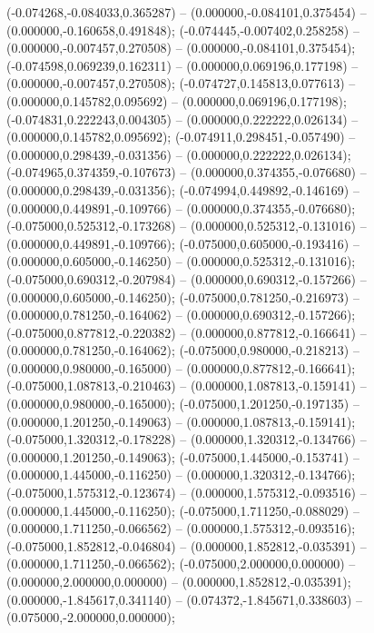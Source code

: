  (-0.074268,-0.084033,0.365287) -- (0.000000,-0.084101,0.375454) -- (0.000000,-0.160658,0.491848);
 (-0.074445,-0.007402,0.258258) -- (0.000000,-0.007457,0.270508) -- (0.000000,-0.084101,0.375454);
 (-0.074598,0.069239,0.162311) -- (0.000000,0.069196,0.177198) -- (0.000000,-0.007457,0.270508);
 (-0.074727,0.145813,0.077613) -- (0.000000,0.145782,0.095692) -- (0.000000,0.069196,0.177198);
 (-0.074831,0.222243,0.004305) -- (0.000000,0.222222,0.026134) -- (0.000000,0.145782,0.095692);
 (-0.074911,0.298451,-0.057490) -- (0.000000,0.298439,-0.031356) -- (0.000000,0.222222,0.026134);
 (-0.074965,0.374359,-0.107673) -- (0.000000,0.374355,-0.076680) -- (0.000000,0.298439,-0.031356);
 (-0.074994,0.449892,-0.146169) -- (0.000000,0.449891,-0.109766) -- (0.000000,0.374355,-0.076680);
 (-0.075000,0.525312,-0.173268) -- (0.000000,0.525312,-0.131016) -- (0.000000,0.449891,-0.109766);
 (-0.075000,0.605000,-0.193416) -- (0.000000,0.605000,-0.146250) -- (0.000000,0.525312,-0.131016);
 (-0.075000,0.690312,-0.207984) -- (0.000000,0.690312,-0.157266) -- (0.000000,0.605000,-0.146250);
 (-0.075000,0.781250,-0.216973) -- (0.000000,0.781250,-0.164062) -- (0.000000,0.690312,-0.157266);
 (-0.075000,0.877812,-0.220382) -- (0.000000,0.877812,-0.166641) -- (0.000000,0.781250,-0.164062);
 (-0.075000,0.980000,-0.218213) -- (0.000000,0.980000,-0.165000) -- (0.000000,0.877812,-0.166641);
 (-0.075000,1.087813,-0.210463) -- (0.000000,1.087813,-0.159141) -- (0.000000,0.980000,-0.165000);
 (-0.075000,1.201250,-0.197135) -- (0.000000,1.201250,-0.149063) -- (0.000000,1.087813,-0.159141);
 (-0.075000,1.320312,-0.178228) -- (0.000000,1.320312,-0.134766) -- (0.000000,1.201250,-0.149063);
 (-0.075000,1.445000,-0.153741) -- (0.000000,1.445000,-0.116250) -- (0.000000,1.320312,-0.134766);
 (-0.075000,1.575312,-0.123674) -- (0.000000,1.575312,-0.093516) -- (0.000000,1.445000,-0.116250);
 (-0.075000,1.711250,-0.088029) -- (0.000000,1.711250,-0.066562) -- (0.000000,1.575312,-0.093516);
 (-0.075000,1.852812,-0.046804) -- (0.000000,1.852812,-0.035391) -- (0.000000,1.711250,-0.066562);
 (-0.075000,2.000000,0.000000) -- (0.000000,2.000000,0.000000) -- (0.000000,1.852812,-0.035391);
 (0.000000,-1.845617,0.341140) -- (0.074372,-1.845671,0.338603) -- (0.075000,-2.000000,0.000000);
